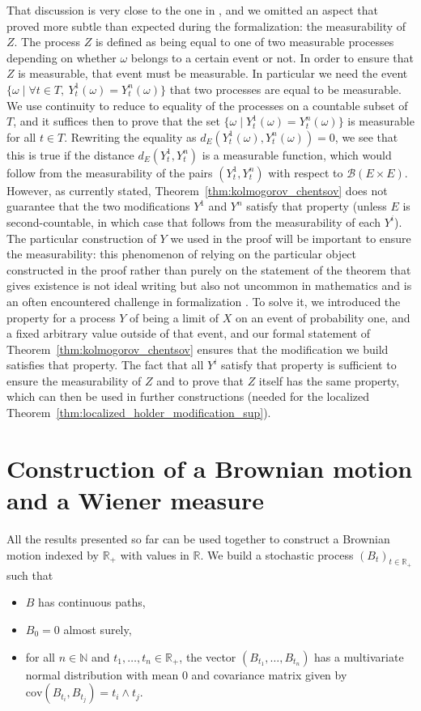 \documentclass[lean]{Draft}
\begin{document}
That discussion is very close to the one in \cite{kratschmer2023kolmogorov}, and we omitted an aspect that proved more subtle than expected during the formalization: the measurability of $Z$.
The process $Z$ is defined as being equal to one of two measurable processes depending on whether $\omega$ belongs to a certain event or not.
In order to ensure that $Z$ is measurable, that event must be measurable.
In particular we need the event $\{\omega \mid \forall t \in T, \: Y_t^1(\omega) = Y_t^n(\omega)\}$ that two processes are equal to be measurable.
We use continuity to reduce to equality of the processes on a countable subset of $T$, and it suffices then to prove that the set $\{\omega \mid Y_t^1(\omega) = Y_t^n(\omega)\}$ is measurable for all $t \in T$.
Rewriting the equality as $d_E(Y_t^1(\omega), Y_t^n(\omega)) = 0$, we see that this is true if the distance $d_E(Y_t^1, Y_t^n)$ is a measurable function, which would follow from the measurability of the pairs $(Y_t^1, Y_t^n)$ with respect to $\mathcal{B}(E \times E)$.
However, as currently stated, Theorem~\ref{thm:kolmogorov_chentsov} does not guarantee that the two modifications $Y^1$ and $Y^n$ satisfy that property (unless $E$ is second-countable, in which case that follows from the measurability of each $Y^i$).
The particular construction of $Y$ we used in the proof will be important to ensure the measurability: this phenomenon of relying on the particular object constructed in the proof rather than purely on the statement of the theorem that gives existence is not ideal writing but also not uncommon in mathematics and is an often encountered challenge in formalization \cite{morelTalk}.
To solve it, we introduced the property for a process $Y$ of being a limit of $X$ on an event of probability one, and a fixed arbitrary value outside of that event, and our formal statement of Theorem~\ref{thm:kolmogorov_chentsov} ensures that the modification we build satisfies that property.
The fact that all $Y^i$ satisfy that property is sufficient to ensure the measurability of $Z$ and to prove that $Z$ itself has the same property, which can then be used in further constructions (needed for the localized Theorem~\ref{thm:localized_holder_modification_sup}).


\section{Construction of a Brownian motion and a Wiener measure}
\label{S:BM}

All the results presented so far can be used together to construct a Brownian motion indexed by $\mathbb{R}_+$ with values in $\mathbb{R}$.
We build a stochastic process $(B_t)_{t \in \mathbb{R}_+}$ such that
\begin{itemize}
  \item $B$ has continuous paths,
  \item $B_0 = 0$ almost surely,
  \item for all $n \in \mathbb{N}$ and $t_1, \ldots, t_n \in \mathbb{R}_+$, the vector $(B_{t_1}, \ldots, B_{t_n})$ has a multivariate normal distribution with mean $0$ and covariance matrix given by $\mathrm{cov}(B_{t_i}, B_{t_j}) = t_i \wedge t_j$.
\end{itemize}
\end{document}
